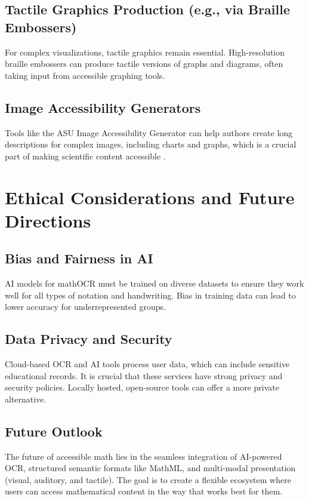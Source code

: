 \subsection{Tactile Graphics Production (e.g., via Braille Embossers)}\label{ch11:ssec:tactile-graphics}
For complex visualizations, tactile graphics remain essential. High-resolution braille embossers can produce tactile versions of graphs and diagrams, often taking input from accessible graphing tools.

\subsection{Image Accessibility Generators}\label{ch11:ssec:image-generators}
Tools like the ASU Image Accessibility Generator can help authors create long descriptions for complex images, including charts and graphs, which is a crucial part of making scientific content accessible \supercite{ASUImageAccessibilityGenerator}.

\section{Ethical Considerations and Future Directions}\label{ch11:sec:ethics}
\subsection{Bias and Fairness in AI}\label{ch11:ssec:bias}
\gls{AI} models for \gls{mathOCR} must be trained on diverse datasets to ensure they work well for all types of notation and handwriting. Bias in training data can lead to lower accuracy for underrepresented groups.

\subsection{Data Privacy and Security}\label{ch11:ssec:privacy}
Cloud-based \gls{OCR} and \gls{AI} tools process user data, which can include sensitive educational records. It is crucial that these services have strong privacy and security policies. Locally hosted, open-source tools can offer a more private alternative.

\subsection{Future Outlook}\label{ch11:ssec:future}
The future of accessible math lies in the seamless integration of \gls{AI}-powered \gls{OCR}, structured semantic formats like \gls{MathML}, and multi-modal presentation (visual, auditory, and tactile). The goal is to create a flexible ecosystem where users can access mathematical content in the way that works best for them.

